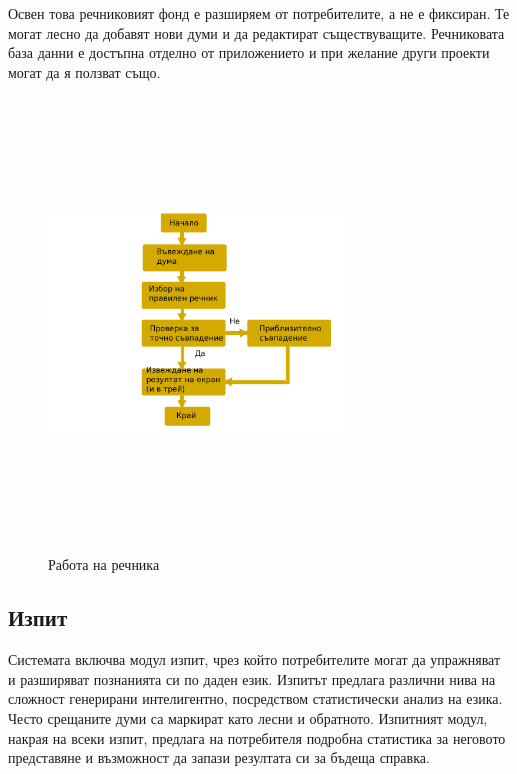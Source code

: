 Освен това речниковият фонд е разширяем от потребителите, а не е
фиксиран. Те могат лесно да добавят нови думи и да редактират
съществуващите. Речниковата база данни е достъпна отделно от приложението
и при желание други проекти могат да я ползват също.
\begin{figure}[htbp]
  \caption{Работа на речника}
  \centering
  \includegraphics[width=80mm, height=120mm]{images/dictionary_flow.png}
\end{figure}

\subsection{Изпит}
Системата включва модул изпит, чрез който потребителите могат да
упражняват и разширяват познанията си по даден език. Изпитът предлага
различни нива на сложност генерирани интелигентно, посредством
статистически анализ на езика. Често срещаните думи са маркират като
лесни и обратното. Изпитният модул, накрая на всеки изпит, предлага на
потребителя подробна статистика за неговото представяне и възможност
да запази резултата си за бъдеща справка.

